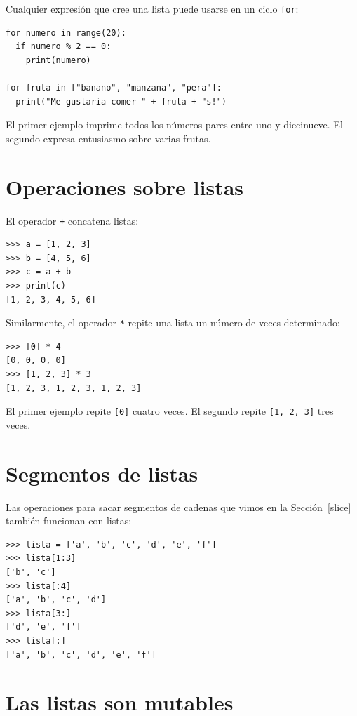 Cualquier expresión que cree una lista puede usarse en un ciclo \texttt{for}:
\begin{lstlisting}
for numero in range(20):
  if numero % 2 == 0:
    print(numero)

for fruta in ["banano", "manzana", "pera"]:
  print("Me gustaria comer " + fruta + "s!")
\end{lstlisting}
El primer ejemplo imprime todos los números pares entre uno y diecinueve.
El segundo expresa entusiasmo sobre varias frutas.

\section{Operaciones sobre listas}

 

El operador \texttt{+} concatena listas:

\begin{lstlisting}
>>> a = [1, 2, 3]
>>> b = [4, 5, 6]
>>> c = a + b
>>> print(c)
[1, 2, 3, 4, 5, 6]
\end{lstlisting}
Similarmente, el operador \texttt{{*}} repite una lista un número
de veces determinado:

\begin{lstlisting}
>>> [0] * 4
[0, 0, 0, 0]
>>> [1, 2, 3] * 3
[1, 2, 3, 1, 2, 3, 1, 2, 3]
\end{lstlisting}
El primer ejemplo repite \texttt{{[}0{]}} cuatro veces. El segundo
repite \texttt{{[}1, 2, 3{]}} tres veces.

\section{Segmentos de listas}

 

Las operaciones para sacar segmentos de cadenas que vimos en la Sección~\ref{slice}
también funcionan con listas:
\begin{lstlisting}
>>> lista = ['a', 'b', 'c', 'd', 'e', 'f']
>>> lista[1:3]
['b', 'c']
>>> lista[:4]
['a', 'b', 'c', 'd']
>>> lista[3:]
['d', 'e', 'f']
>>> lista[:]
['a', 'b', 'c', 'd', 'e', 'f']
\end{lstlisting}
\section{Las listas son mutables}

